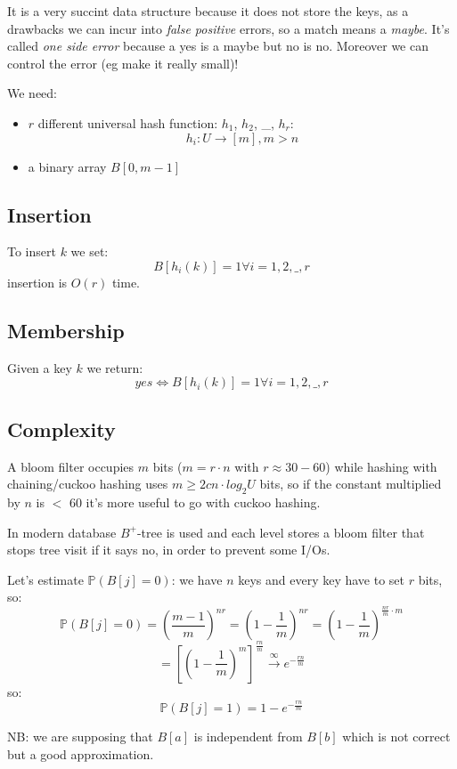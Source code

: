 It is a very succint data structure because it does not store the keys, as a drawbacks we can incur into \emph{false positive} errors, so a match means a \emph{maybe}.
It's called \emph{one side error} because a yes is a maybe but no is no.
Moreover we can control the error (eg make it really small)!

We need:
\begin{itemize}
    \item $r$ different universal hash function: $h_1$, $h_2$, \_, $h_r$:
    $$
        h_i : U \xrightarrow{} [m], m > n
    $$
    \item a binary array $B[0, m-1]$
\end{itemize}

\subsection{Insertion}
To insert $k$ we set:
$$
    B[h_i(k)] = 1 \forall i = 1, 2, \_, r
$$
insertion is $O(r)$ time.

\subsection{Membership}
Given a key $k$ we return:
$$
    yes \iff B[h_i(k)] = 1 \forall i = 1, 2, \_, r
$$

\subsection{Complexity}
A bloom filter occupies $m$ bits ($m = r \cdot n$ with $r \approx 30-60$) while hashing with chaining/cuckoo hashing uses $m \geq 2 c n \cdot log_2 U$ bits, so if the constant multiplied by $n$ is $<$ 60 it's more useful to go with cuckoo hashing.

In modern database $B^+$-tree is used and each level stores a bloom filter that stops tree visit if it says no, in order to prevent some I/Os.

Let's estimate $\mathbb{P}(B[j] = 0)$: we have $n$ keys and every key have to set $r$ bits, so:
$$
    \mathbb{P}(B[j] = 0) = \left( \frac{m-1}{m} \right)^{n r} = \left( 1 - \frac{1}{m} \right)^{n r} = \left( 1 - \frac{1}{m} \right)^{\frac{n r}{m} \cdot m}
$$
$$
    = \left[ \left( 1 - \frac{1}{m} \right)^m \right]^{\frac{r n}{m}} \xrightarrow{\infty} e^{-\frac{r n}{m}}
$$
so:
$$
    \mathbb{P}(B[j] = 1) = 1 - e^{- \frac{r n}{m}}
$$

NB: we are supposing that $B[a]$ is independent from $B[b]$ which is not correct but a good approximation.

